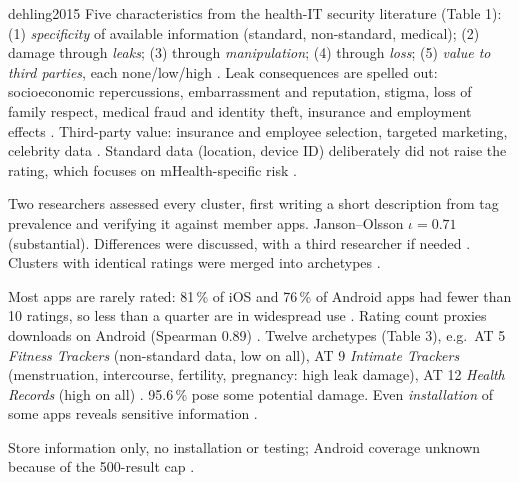 \begin{papercard}{dehling2015}
 Five characteristics from the health-IT security literature (Table 1): (1) \emph{specificity} of available information (standard, non-standard, medical); (2) damage through \emph{leaks}; (3) through \emph{manipulation}; (4) through \emph{loss}; (5) \emph{value to third parties}, each none/low/high . Leak consequences are spelled out: socioeconomic repercussions, embarrassment and reputation, stigma, loss of family respect, medical fraud and identity theft, insurance and employment effects . Third-party value: insurance and employee selection, targeted marketing, celebrity data . Standard data (location, device ID) deliberately did not raise the rating, which focuses on mHealth-specific risk .

 Two researchers assessed every cluster, first writing a short description from tag prevalence and verifying it against member apps. Janson--Olsson $\iota=0.71$ (substantial). Differences were discussed, with a third researcher if needed . Clusters with identical ratings were merged into archetypes .

 Most apps are rarely rated: 81\,\% of iOS and 76\,\% of Android apps had fewer than 10 ratings, so less than a quarter are in widespread use . Rating count proxies downloads on Android (Spearman 0.89) . Twelve archetypes (Table 3), e.g.\ AT 5 \emph{Fitness Trackers} (non-standard data, low on all), AT 9 \emph{Intimate Trackers} (menstruation, intercourse, fertility, pregnancy: high leak damage), AT 12 \emph{Health Records} (high on all) . 95.6\,\% pose some potential damage. Even \emph{installation} of some apps reveals sensitive information .

 Store information only, no installation or testing; Android coverage unknown because of the 500-result cap .


\end{papercard}
